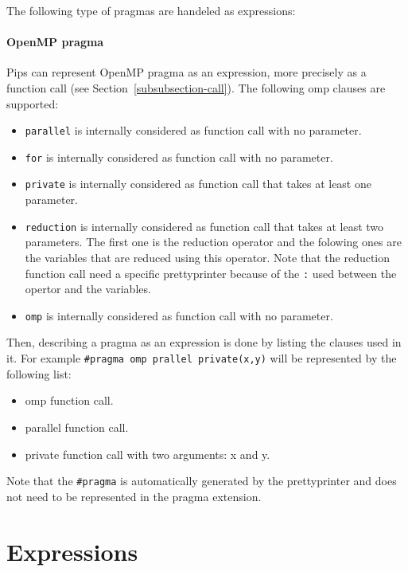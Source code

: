 \documentclass[a4paper]{article}
\begin{document}
The following type of pragmas are handeled as expressions:


\paragraph{OpenMP pragma}
\label{par:openmp-pragma}

Pips can represent OpenMP pragma as an expression, more precisely as a
function call (see Section~\ref{subsubsection-call}). The following omp
clauses are supported:

\begin{itemize}
  \item \verb|parallel| is internally considered as function call with no parameter.
  \item \verb|for| is internally considered as function call with no parameter.
  \item \verb|private| is internally considered as function call that takes at least
    one parameter.
  \item \verb|reduction| is internally considered as function call that takes at
    least two parameters. The first one is the reduction operator and the
    folowing ones are the variables that are reduced using this operator.
    Note that the reduction function call need a specific prettyprinter
    because of the \verb|:| used between the opertor and the variables.
  \item \verb|omp| is internally considered as function call with no parameter.
\end{itemize}

Then, describing a pragma as an expression is done by listing the clauses
used in it. For example \verb|#pragma omp prallel private(x,y)| will be represented
by the following list:
\begin{itemize}
  \item omp function call.
  \item parallel function call.
  \item private function call with two arguments: x and y.
\end{itemize}
Note that the \verb|#pragma| is automatically generated by the prettyprinter and does
not need to be represented in the pragma extension.

\section{Expressions}
\label{expression}
\end{document}
